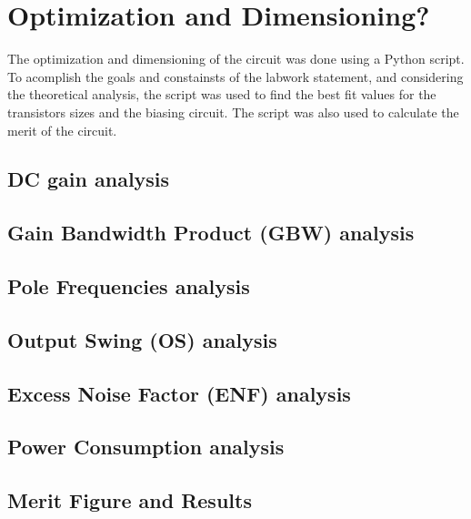 \section{Optimization and Dimensioning?}

The optimization and dimensioning of the circuit was done using a Python script. To acomplish the goals and constainsts of the labwork statement, and considering the theoretical analysis, the script was used to find the best fit values for the transistors sizes and the biasing circuit. The script was also used to calculate the merit of the circuit.

\subsection{DC gain analysis}

\subsection{Gain Bandwidth Product (GBW) analysis}

\subsection{Pole Frequencies analysis}

\subsection{Output Swing (OS) analysis}

\subsection{Excess Noise Factor (ENF) analysis}

\subsection{Power Consumption analysis}

\subsection{Merit Figure and Results}
